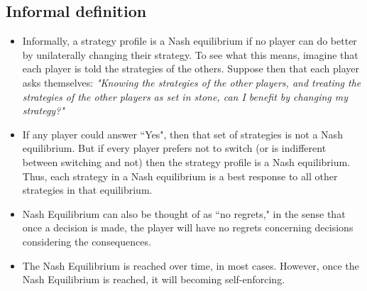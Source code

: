 \documentclass[a4paper,12pt]{article}
\begin{document}
\subsection{Informal definition}
\begin{itemize}
\item Informally, a strategy profile is a Nash equilibrium if no player can do better by unilaterally changing their strategy. To see what this means, imagine that each player is told the strategies of the others. Suppose then that each player asks themselves: \textit{"Knowing the strategies of the other players, and treating the strategies of the other players as set in stone, can I benefit by changing my strategy?"}
\item If any player could answer ``Yes", then that set of strategies is not a Nash equilibrium. But if every player prefers not to switch (or is indifferent between switching and not) then the strategy profile is a Nash equilibrium. Thus, each strategy in a Nash equilibrium is a best response to all other strategies in that equilibrium.
\item Nash Equilibrium can also be thought of as ``no regrets," in the sense that once a decision is made, the player will have no regrets concerning decisions considering the consequences.
 
\item The Nash Equilibrium is reached over time, in most cases. However, once the Nash Equilibrium is reached, it will becoming self-enforcing. %
\end{itemize}
\newpage
\end{document}
